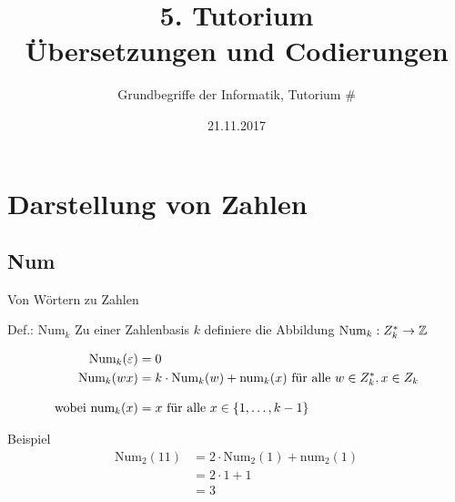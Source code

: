 



\title[Übersetzungen und Codierungen]{5. Tutorium\\ Übersetzungen und Codierungen}
\subtitle{Grundbegriffe der Informatik, Tutorium \#\mytutnumber}
\date{21.11.2017}

\usepackage[normalem]{ulem}


\titleframe
\roadmap


\section{Darstellung von Zahlen}

\subsection{Num}
\begin{frame}{Von Wörtern zu Zahlen}
	\begin{block}{Def.: $\text{Num}_k$}
		Zu einer Zahlenbasis $k$ definiere die Abbildung $\text{Num}_k : Z_k^* \to \mathbb{Z}$ 

		\begin{align*}
			\text{Num}_k(\varepsilon) &= 0 \\
			\text{Num}_k(wx) &= k\cdot \text{Num}_k(w) + \text{num}_k(x) \text{ für alle } w\in Z_k^*, x\in Z_k\\[2ex]
			\text{wobei }\text{num}_k(x) &= x \text{ für alle } x \in \left\{ 1,\dots,k-1 \right\}
		\end{align*}
	\end{block}
	\pause
	\begin{exampleblock}{Beispiel}
		\begin{align*}
			\text{Num}_2(11) &= 2\cdot \text{Num}_2(1) + \text{num}_2(1) \\
				&= 2\cdot 1 + 1 \\
				&= 3
		\end{align*}
	\end{exampleblock}
\end{frame}

